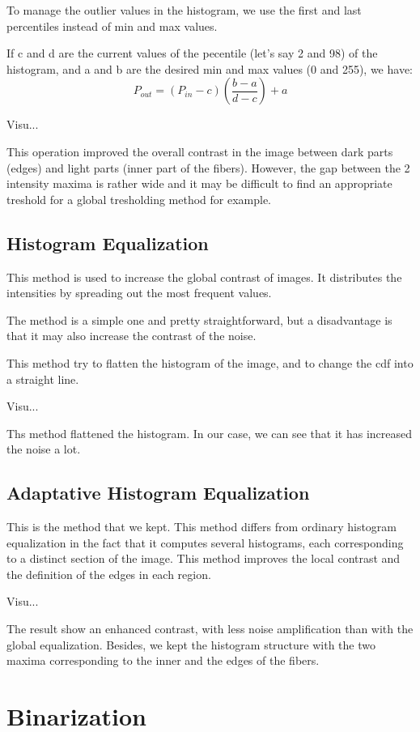\documentclass{report}
\begin{document}
To manage the outlier values in the histogram, we use the first and last percentiles instead of min and max values.

If c and d are the current values of the pecentile (let's say 2 and 98) of the histogram, and a and b are the desired min and max values (0 and 255), we have:
$$ P_{out} = (P_{in}-c)(\frac{b-a}{d-c})+a $$


Visu...

This operation improved the overall contrast in the image between dark parts (edges) and light parts (inner part of the fibers).  
However, the gap between the 2 intensity maxima is rather wide and it may be difficult to find an appropriate treshold for a global tresholding method for example.

\subsection{Histogram Equalization}

This method is used to increase the global contrast of images. It distributes the intensities by spreading out the most frequent values.

The method is a simple one and pretty straightforward, but a disadvantage is that it may also increase the contrast of the noise.

This method try to flatten the histogram of the image, and to change the cdf into a straight line.

Visu...

Ths method flattened the histogram.  
In our case, we can see that it has increased the noise a lot.

\subsection{Adaptative Histogram Equalization}
This is the method that we kept.
This method differs from ordinary histogram equalization in the fact that it computes several histograms, each corresponding to a distinct section of the image.  
This method improves the local contrast and the definition of the edges in each region.

Visu...

The result show an enhanced contrast, with less noise amplification than with the global equalization.  
Besides, we kept the histogram structure with the two maxima corresponding to the inner and the edges of the fibers.

\section{Binarization}
\end{document}
